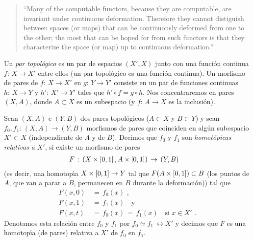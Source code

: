 \theoremstyle{plain}
\newtheorem{teoDeLaEsferaAlDisco}{Teorema}[section]

\theoremstyle{remark}
\newtheorem{obsHomotopiaEsEquivalencia}[teoDeLaEsferaAlDisco]{Observaci\'{o}n}
\newtheorem{obsComposicionesDeHomotopicasSonHomotopicas}[teoDeLaEsferaAlDisco]%
	{Observaci\'{o}n}
\newtheorem{obsEnContractilSonHomotopicos}[teoDeLaEsferaAlDisco]%
	{Observaci\'{o}n}
\newtheorem{obsDeLaEsferaAlDisco}[teoDeLaEsferaAlDisco]{Observaci\'{o}n}


\begin{quote}
	``Many of the computable functors, because they are computable, are
	invariant under continuous deformation. Therefore they cannot
	distiguish between spaces (or maps) that can be continuously deformed
	from one to the other; the most that can be hoped for from such
	functors is that they characterize the space (or map) up to
	continuous deformation.''
\end{quote}

Un \emph{par topol\'{o}gico} es un par de espacios $(X',X)$ junto con
una funci\'{o}n continua $f:\,X\rightarrow X'$ entre ellos (un par
topol\'{o}gico es una funci\'{o}n continua). Un morfismo de pares de
$f:\,X\rightarrow X'$ en $g:\,Y\rightarrow Y'$ consiste en un par de funciones
continuas $h:\,X\rightarrow Y$ y $h':\,X'\rightarrow Y'$ tales que
$h'\circ f= g\circ h$. Nos concentraremos en pares $(X,A)$, donde $A\subset X$
es un subespacio (y $f:\,A\rightarrow X$ es la inclusi\'{o}n).

Sean $(X,A)$ e $(Y,B)$ dos pares topol\'{o}gicos ($A\subset X$ y $B\subset Y$)
y sean $f_{0},f_{1}:\,(X,A)\rightarrow (Y,B)$ morfismos de pares que coinciden
en alg\'{u}n subespacio $X'\subset X$ (independiente de $A$ y de $B$).
Decimos que $f_{0}$ y $f_{1}$ son \emph{homot\'{o}picas relativas a $X'$},
si existe un morfismo de pares
\begin{align*}
	F & \,:\,(X\times\left[0,1\right],A\times\left[0,1\right])\,\rightarrow\,
		(Y,B)
\end{align*}
%
(es decir, una homotop\'{\i}a $X\times\left[0,1\right]\rightarrow Y$ tal que
$F(A\times\left[0,1\right])\subset B$ (los puntos de $A$, que van a parar a $B$,
permanecen en $B$ durante la deformaci\'{o}n)) tal que
\begin{align*}
	F(x,0) & \,=\,f_{0}(x) \text{ ,} \\
	F(x,1) & \,=\,f_{1}(x) \quad\text{y} \\
	F(x,t) & \,=\,f_{0}(x)\,=\,f_{1}(x) \quad\text{si }x\in X'
	\text{ .}
\end{align*}
%
Denotamos esta relaci\'{o}n entre $f_{0}$ y $f_{1}$ por
$f_{0}\simeq f_{1}\,\rel{X'}$ y decimos que $F$ es una homotop\'{\i}a (de pares)
relativa a $X'$ de $f_{0}$ en $f_{1}$.

